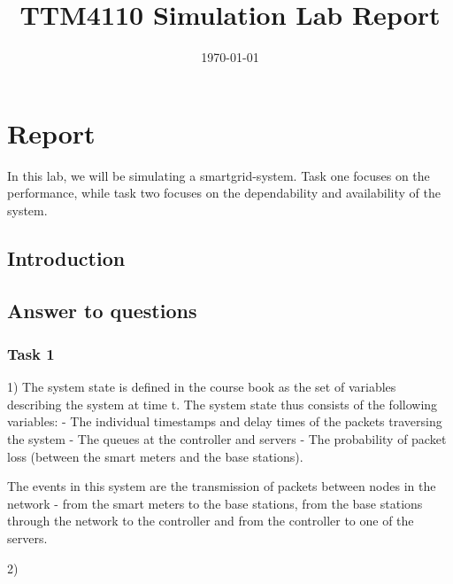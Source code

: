 \documentclass[11pt]{article}
\title{TTM4110 Simulation Lab Report}
\date{{\today}}
\begin{document}
\pagestyle{plain}

\maketitle

\section{Report}

In this lab, we will be simulating a smartgrid-system. Task one focuses on the performance, while task two focuses on the dependability and availability of the system.

\subsection{Introduction}

\newpage
\subsection{Answer to questions}

\subsubsection{Task 1}

1) The system state is defined in the course book as the set of variables describing the system at time t. The system state thus consists of the following variables:
- The individual timestamps and delay times of the packets traversing the system
- The queues at the controller and servers
- The probability of packet loss (between the smart meters and the base stations).

The events in this system are the transmission of packets between nodes in the network - from the smart meters to the base stations, from the base stations through the network to the controller and from the controller to one of the servers.\\

\newpage

2) 
\end{document}
